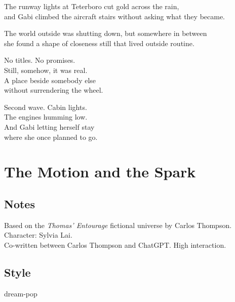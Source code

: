 \begin{lyrics}
The runway lights at Teterboro cut gold across the rain,\\
and Gabi climbed the aircraft stairs without asking what they became.

The world outside was shutting down, but somewhere in between\\
she found a shape of closeness still that lived outside routine.

No titles. No promises.\\
Still, somehow, it was real.\\
A place beside somebody else\\
without surrendering the wheel.

Second wave. Cabin lights.\\
The engines humming low.\\
And Gabi letting herself stay\\
where she once planned to go.

\end{lyrics}

\section{The Motion and the Spark}

\subsection{Notes}
Based on the \emph{Thomas' Entourage} fictional universe by Carlos Thompson.\\
Character: Sylvia Lai.\\
Co-written between Carlos Thompson and ChatGPT. High interaction.

\subsection{Style}
dream-pop

